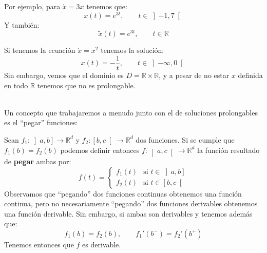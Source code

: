 \begin{ejemplo}
    Por ejemplo, para $\dot{x}= 3x$ tenemos que:
    \begin{equation*}
        x(t) = e^{3t}, \qquad t\in \left]-1,7\right[
    \end{equation*}
    Y también:
    \begin{equation*}
        \tilde{x}(t) = e^{3t}, \qquad t\in \mathbb{R}
    \end{equation*}
\end{ejemplo}

\begin{ejemplo}
    Si tenemos la ecuación $\dot{x} = x^2$ tenemos la solución:
    \begin{equation*}
        x(t) = -\frac{1}{t}, \qquad t\in \left]-\infty,0\right[
    \end{equation*}
    Sin embargo, vemos que el dominio es $D=\mathbb{R}\times \mathbb{R}$, y a pesar de no estar $x$ definida en todo $\mathbb{R}$ tenemos que no es prolongable.
\end{ejemplo}~\\

\noindent
Un concepto que trabajaremos a menudo junto con el de soluciones prolongables es el ``pegar'' funciones:

\begin{definicion}
    Sean $f_1:\left]a,b\right]\to \mathbb{R}^d$ y $f_2:\left[b,c\right[\to \mathbb{R}^d$ dos funciones.  Si se cumple que $f_1(b) = f_2(b)$ podemos definir entonces $f:\left]a,c\right[ \to \mathbb{R}^d$ la función resultado de \textbf{pegar} ambas por:
    \begin{equation*}
        f(t) = \left\{\begin{array}{ll}
            f_1(t) & \text{si\ } t\in \left]a,b\right] \\
             f_2(t) & \text{si\ } t\in \left[b,c\right[
        \end{array}\right. 
    \end{equation*}
    Observamos que ``pegando'' dos funciones continuas obtenemos una función continua, pero no necesariamente ``pegando'' dos funciones derivables obtenemos una función derivable. Sin embargo, si ambas son derivables y tenemos además que:
    \begin{equation*}
        f_1(b) = f_2(b), \qquad f_1'(b^-) = f_2'(b^+)
    \end{equation*}
    Tenemos entonces que $f$ es derivable.
\end{definicion}

